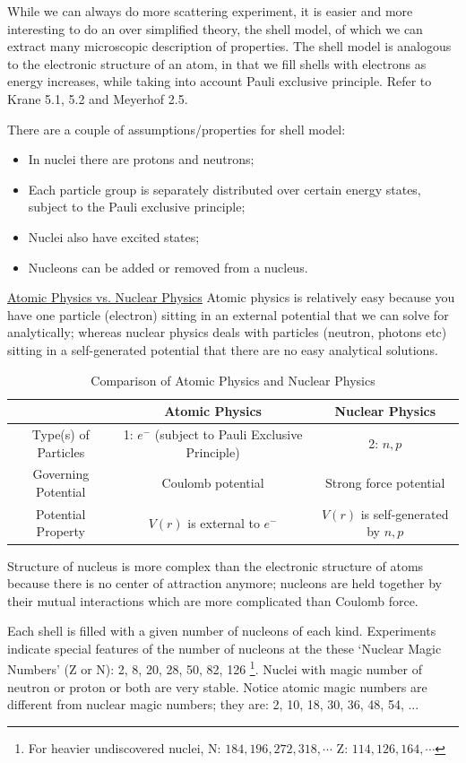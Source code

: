 \documentclass{school-22.101-notes}
\begin{document}
While we can always do more scattering experiment, it is easier and more interesting to do an over simplified theory, the shell model, of which we can extract many microscopic description of properties. The shell model is analogous to the electronic structure of an atom, in that we fill shells with electrons as energy increases, while taking into account Pauli exclusive principle. Refer to Krane 5.1, 5.2 and Meyerhof 2.5. 

There are a couple of assumptions/properties for shell model: 
\begin{itemize}
\item In nuclei there are protons and neutrons;
\item Each particle group is separately distributed over certain energy states, subject to the Pauli exclusive principle;
\item Nuclei also have excited states;
\item Nucleons can be added or removed from a nucleus. 
\end{itemize}

\uline{Atomic Physics vs. Nuclear Physics}
Atomic physics is relatively easy because you have one particle (electron) sitting in an external potential that we can solve for analytically; whereas nuclear physics deals with particles (neutron, photons etc) sitting in a self-generated potential that there are no easy analytical solutions. 
\begin{table}[h!]
    \centering
    \begin{tabular}{|c|c|c|} \hline
    & Atomic Physics & Nuclear Physics \\ \hline
    Type(s) of Particles &   1: $e^-$ (subject to Pauli Exclusive Principle) & 2: $n, p$ \\ \hline
    Governing Potential & Coulomb potential & Strong force potential \\ \hline
    Potential Property & $V(r)$ is external to $e^-$ & $V(r)$ is self-generated by $n,p$ \\ \hline
    \end{tabular}
    \caption{Comparison of Atomic Physics and Nuclear Physics}
\end{table}

Structure of nucleus is more complex than the electronic structure of atoms because there is no center of attraction anymore; nucleons are held together by their mutual interactions which are more complicated than Coulomb force. 

Each shell is filled with a given number of nucleons of each kind. Experiments indicate special features of the number of nucleons at the these `Nuclear Magic Numbers' (Z or N): 2, 8, 20, 28, 50, 82, 126 \footnote{For heavier undiscovered nuclei, N: $184, 196, 272, 318, \cdots$ Z: $114, 126, 164, \cdots$}. Nuclei with magic number of neutron or proton or both are very stable. Notice atomic magic numbers are different from nuclear magic numbers; they are: 2, 10, 18, 30, 36, 48, 54, ...
\end{document}
